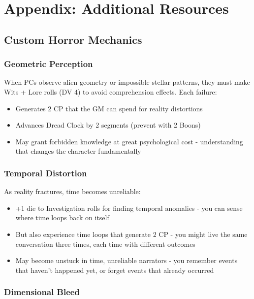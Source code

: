 \documentclass[11pt]{article}
\begin{document}
\section{Appendix: Additional Resources}

\subsection{Custom Horror Mechanics}

\subsubsection{Geometric Perception}

When PCs observe alien geometry or impossible stellar patterns, they must make Wits + Lore rolls (DV 4) to avoid comprehension effects. Each failure:
\begin{itemize}
\item Generates 2 CP that the GM can spend for reality distortions
\item Advances Dread Clock by 2 segments (prevent with 2 Boons)
\item May grant forbidden knowledge at great psychological cost - understanding that changes the character fundamentally
\end{itemize}

\subsubsection{Temporal Distortion}

As reality fractures, time becomes unreliable:
\begin{itemize}
\item +1 die to Investigation rolls for finding temporal anomalies - you can sense where time loops back on itself
\item But also experience time loops that generate 2 CP - you might live the same conversation three times, each time with different outcomes
\item May become unstuck in time, unreliable narrators - you remember events that haven't happened yet, or forget events that already occurred
\end{itemize}

\subsubsection{Dimensional Bleed}
\end{document}
